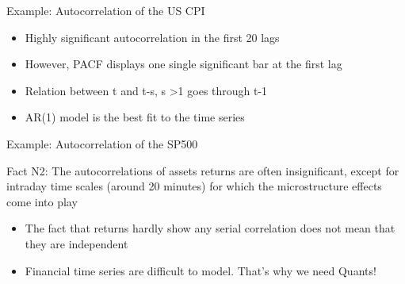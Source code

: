 \documentclass{beamer}
\begin{document}
\begin{frame}{Example: Autocorrelation of the US CPI }
  
 
 \begin{itemize}
     \item Highly significant autocorrelation in the first 20 lags
     \item However, PACF displays one single significant bar at the first lag
     \item Relation between t and t-s, s >1 goes through t-1
     \item AR(1) model is the best fit to the time series
 \end{itemize}
\end{frame}

\begin{frame}{Example: Autocorrelation of the SP500}
   \begin{exampleblock}{Fact N2:}
    The autocorrelations of assets returns are often insignificant, except for intraday time scales (around 20 minutes) for which the microstructure effects come into play
  \end{exampleblock}
  

 \begin{itemize}
     \item The fact that returns hardly show any serial correlation does not mean that they are independent
     \item Financial time series are difficult to model. That's why we need Quants!
 \end{itemize}
 
\end{frame}
\end{document}
